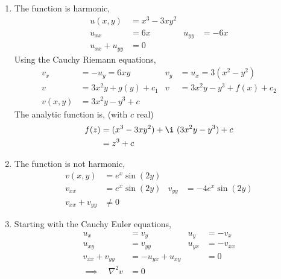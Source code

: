 \begin{enumerate}
    \item The function is \textcolor{y_h}{harmonic},
          \begin{align}
              u(x, y)         & = x^3 - 3xy^2   \\
              u_{xx}          & = 6x          &
              u_{yy}          & = -6x           \\
              u_{xx} + u_{yy} & = 0
          \end{align}
          Using the Cauchy Riemann equations,
          \begin{align}
              v_x     & = -u_y = 6xy                &
              v_y     & = u_x = 3(x^2 - y^2)          \\
              v       & = 3x^2 y + g(y) + c_1       &
              v       & = 3x^2 y - y^3 + f(x) + c_2   \\
              v(x, y) & = 3x^2 y - y^3 + c
          \end{align}
          The analytic function is, (with $ c $ real)
          \begin{align}
              f(z) & = (x^3 - 3xy^2) + \i\ (3x^2y - y^3) + c \\
                   & = z^3 + c
          \end{align}

    \item The function is \textcolor{y_p}{not harmonic},
          \begin{align}
              v(x, y)         & = e^x \sin(2y)     \\
              v_{xx}          & = e^x \sin(2y)   &
              v_{yy}          & = -4e^x \sin(2y)   \\
              v_{xx} + v_{yy} & \neq 0
          \end{align}

    \item Starting with the Cauchy Euler equations,
          \begin{align}
              u_x                       & = v_y              & u_y    & = -v_x    \\
              u_{xy}                    & = v_{yy}           & u_{yx} & = -v_{xx} \\
              v_{xx} + v_{yy}           & = -u_{yx} + u_{xy} &
                                        & = 0                                     \\
              \implies \quad \nabla^2 v & = 0
          \end{align}


\end{enumerate}
